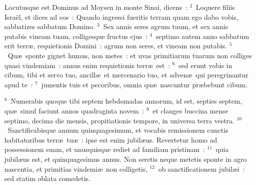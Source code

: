 \lettrine[lines=3,image=true,loversize=0.05,lraise=-0.03]{L}{}ocutusque est Dominus ad Moysen in monte Sinai, dicens~:
${}^{2}$~Loquere filiis Isra\"el, et dices ad eos~: Quando ingressi fueritis terram quam ego dabo vobis, sabbatizes sabbatum Domino.
${}^{3}$~Sex annis seres agrum tuum, et sex annis putabis vineam tuam, colligesque fructus ejus~:
${}^{4}$~septimo autem anno sabbatum erit terr\ae , requietionis Domini~: agrum non seres, et vineam non putabis.
${}^{5}$~Qu\ae\ sponte gignet humus, non metes~: et uvas primitiarum tuarum non colliges quasi vindemiam~: annus enim requietionis terr\ae\ est~:
${}^{6}$~sed erunt vobis in cibum, tibi et servo tuo, ancill\ae\ et mercenario tuo, et adven\ae\ qui peregrinantur apud te~:
${}^{7}$~jumentis tuis et pecoribus, omnia qu\ae\ nascuntur pr\ae bebunt cibum.


${}^{8}$~Numerabis quoque tibi septem hebdomadas annorum, id est, septies septem, qu\ae\ simul faciunt annos quadraginta novem~:
${}^{9}$~et clanges buccina mense septimo, decima die mensis, propitiationis tempore, in universa terra vestra.
${}^{10}$~Sanctificabisque annum quinquagesimum, et vocabis remissionem cunctis habitatoribus terr\ae\ tu\ae~: ipse est enim jubil\ae us. Revertetur homo ad possessionem suam, et unusquisque rediet ad familiam pristinam~:
${}^{11}$~quia jubil\ae us est, et quinquagesimus annus. Non seretis neque metetis sponte in agro nascentia, et primitias vindemi\ae\ non colligetis,
${}^{12}$~ob sanctificationem jubil\ae i~: sed statim oblata comedetis.


